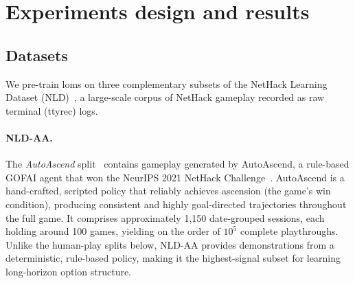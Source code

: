 \documentclass{article}
\theoremstyle{postulate}
\begin{document}






\section{Experiments design and results}
\label{sec:results}

\subsection{Datasets}
\label{sec:datasets}
We pre-train \glspl{lom} on three complementary subsets of the NetHack Learning
Dataset (NLD)~\citep{hambro2022nld}, a large-scale corpus of NetHack gameplay
recorded as raw terminal (ttyrec) logs.

\paragraph{NLD-AA.}
The \emph{AutoAscend} split~\citep{hambro2022nethack} contains gameplay generated
by AutoAscend, a rule-based GOFAI agent that won the NeurIPS 2021 NetHack
Challenge~\citep{hambro2022nethack}.
AutoAscend is a hand-crafted, scripted policy that reliably achieves ascension
(the game's win condition), producing consistent and highly goal-directed
trajectories throughout the full game.
It comprises approximately 1,150 date-grouped sessions, each holding around 100
games, yielding on the order of $10^5$ complete playthroughs.
Unlike the human-play splits below, NLD-AA provides demonstrations from a
deterministic, rule-based policy, making it the highest-signal subset for
learning long-horizon option structure.
\end{document}
